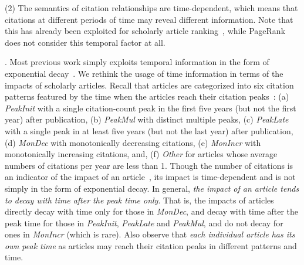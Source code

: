 \noindent(2) The semantics of citation relationships are time-dependent, which means that citations at different periods of time may reveal different information. Note that this has already been exploited for scholarly article ranking~\cite{Li08TSRanking,Wang13AAAI,WalkerXKM07}, while PageRank does not consider this temporal factor at all.

. Most previous work simply exploits temporal information in the form of exponential decay~\cite{Li08TSRanking,Wang13AAAI,sayyadi09,WalkerXKM07}. We rethink the usage of time information in terms of the impacts of scholarly articles.
Recall that articles are categorized  into six citation patterns featured by the time when the articles reach their citation peaks~\cite{Chakraborty15}: (a) {\em PeakInit} with a single citation-count peak in the first five years (but not the first year) after publication, (b) {\em PeakMul} with distinct multiple peaks, (c) {\em PeakLate} with a single peak in at least five years   (but not the last year) after publication, (d) {\em MonDec} with monotonically decreasing citations, (e) {\em MonIncr} with monotonically increasing citations, and, (f) {\em Other} for articles whose average numbers of citations per year are less than 1. Though the number of citations is an indicator of the impact of an article~\cite{WangSB13,Garfield471}, its impact is time-dependent and is not simply in the form of exponential decay.
In general, {\em the impact of an article tends to decay with time after the peak time only}. That is, the impacts of articles directly decay with time only for those in {\em MonDec}, and decay with time after the peak time for those in {\em PeakInit}, {\em PeakLate} and {\em PeakMul}, and do not decay for ones in {\em MonIncr} (which is rare).
Also observe that {\em each individual article has its own peak time} as articles may reach their citation peaks in different patterns and time.


